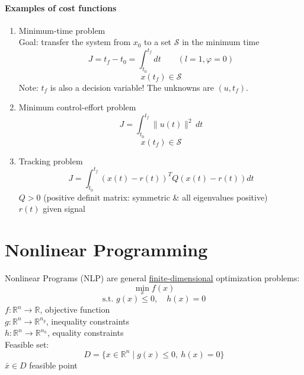 \documentclass[12pt,a4paper,oneside]{scrartcl}
\begin{document}
	\paragraph{Examples of cost functions}
	\begin{enumerate}[label=\arabic*)]
		\item Minimum-time problem\\
		Goal: transfer the system from $x_0$ to a set $\mathcal{S}$ in the minimum time
		\[
		J = t_f-t_0 = \int_{t_0}^{t_f}dt \qquad (l=1, \varphi=0)
		\]
		\[
		x(t_f) \in \mathcal{S}
		\]
		Note: $t_f$ is also a decision variable! The unknowns are $(u,t_f)$.
		
		\item Minimum control-effort problem
		\[
		J = \int_{t_0}^{t_f} \|u(t)\|^2 \, dt
		\]
		\[
		x(t_f) \in \mathcal{S}
		\]
		
		\item Tracking problem
		\[
		J = \int_{t_0}^{t_f} (x(t)-r(t))^T Q (x(t)-r(t))dt
		\]
		$Q > 0$ (positive definit matrix: symmetric \& all eigenvalues positive) \\
		$r(t)$ given signal
	\end{enumerate}
	
	\section{Nonlinear Programming}
	
	Nonlinear Programs (NLP) are general \underline{finite-dimensional} optimization problems:
	\[
	\underset{x}{\min} f(x)
	\]
	\[
	\text{s.t. } g(x)\leq0, \quad h(x)=0
	\]
	$f: \mathbb{R}^n \rightarrow \mathbb{R}$, objective function\\
	$g: \mathbb{R}^n \rightarrow \mathbb{R}^{n_g}$, inequality constraints\\
	$h: \mathbb{R}^n \rightarrow \mathbb{R}^{n_h}$, equality constraints\\
	Feasible set:
	\[
	D = \{x\in\mathbb{R}^n \mid g(x)\leq0,\ h(x)=0\}
	\]
	$\bar{x}\in D$ feasible point
	
\end{document}
